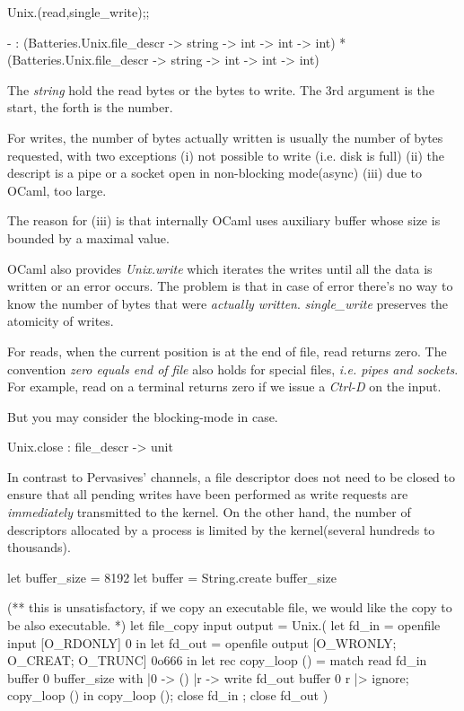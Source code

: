 \begin{enumerate}
  \begin{alternate}
    Unix.(read,single_write);;
  \end{alternate}
  \begin{ocamlcode}
  - : (Batteries.Unix.file_descr -> string -> int -> int -> int) *
    (Batteries.Unix.file_descr -> string -> int -> int -> int)
  \end{ocamlcode}    
  The \textit{string} hold the read bytes or the bytes to write. The 3rd
  argument is the start, the forth is the number.

  For writes, the number of bytes actually written is usually the
  number of bytes requested, with two exceptions
  (i) not possible to write (i.e. disk is full) (ii) the descript is a
  pipe or a socket open in non-blocking mode(async) (iii) due to
  OCaml, too large.

  The reason for (iii) is that internally OCaml uses auxiliary buffer
  whose size is bounded by a maximal value.

  OCaml also provides \textit{Unix.write} which iterates the writes
  until all the data is written or an error occurs. The problem is
  that in case of error there's no way to know the number of bytes
  that were \textit{actually written}. \textit{single\_write}
  preserves the atomicity of writes.

  For reads, when the current position is at the end of file, read
  returns zero. The convention \textit{zero equals end of file} also
  holds for special files, \textit{i.e. pipes and sockets}. For
  example, read on a terminal returns zero if we issue a
  \textit{Ctrl-D} on the input.

  But you may consider the blocking-mode in case.

  \begin{ocamlcode}
    Unix.close : file_descr -> unit 
  \end{ocamlcode}
  In contrast to Pervasives' channels, a file descriptor does not need
  to be closed to ensure that all pending writes have been performed
  as write requests are \textit{immediately} transmitted to the
  kernel. On the other hand, the number of descriptors allocated by a
  process is limited by the kernel(several hundreds to thousands).


  \begin{ocamlcode}
let buffer_size = 8192 
let buffer = String.create buffer_size 

(** this is unsatisfactory, if we copy an executable file, we would
like the copy to be also executable. *)
let file_copy input output = Unix.(
  let fd_in = openfile input [O_RDONLY] 0 in 
  let fd_out = openfile output [O_WRONLY; O_CREAT; O_TRUNC] 0o666 in 
  let rec copy_loop () = match read fd_in buffer 0 buffer_size with 
    |0 -> ()
    |r -> write fd_out buffer 0 r |> ignore; copy_loop () in 
  copy_loop ();
  close fd_in ; 
  close fd_out 
)



\end{ocamlcode}
\end{enumerate}
